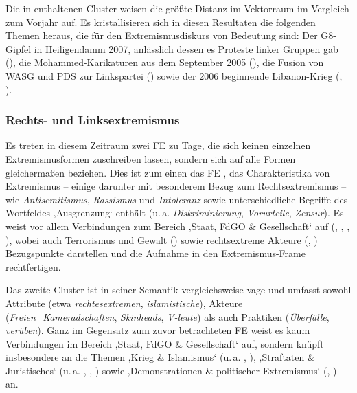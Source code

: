 Die in  enthaltenen Cluster weisen die größte Distanz im Vektorraum im Vergleich zum Vorjahr auf. Es kristallisieren sich in diesen Resultaten die folgenden Themen heraus, die für den Extremismusdiskurs von Bedeutung sind: Der G8-Gipfel in Heiligendamm 2007, anlässlich dessen es Proteste linker Gruppen gab (), die Mohammed-Karikaturen aus dem September 2005 (), die Fusion von WASG und PDS zur Linkspartei () sowie der 2006 beginnende Libanon-Krieg (, ).

\subsubsection{Rechts- und Linksextremismus}\label{rechts--und-linksextremismus-2}

Es treten in diesem Zeitraum zwei FE zu Tage, die sich keinen einzelnen Extremismusformen zuschreiben lassen, sondern sich auf alle Formen gleichermaßen beziehen. Dies ist zum einen das FE , das Charakteristika von Extremismus -- einige darunter mit besonderem Bezug zum Rechtsextremismus -- wie \emph{Antisemitismus}, \emph{Rassismus} und \emph{Intoleranz} sowie unterschiedliche Begriffe des Wortfeldes ‚Ausgrenzung` enthält (u.\,a. \emph{Diskriminierung}, \emph{Vorurteile}, \emph{Zensur}). Es weist vor allem Verbindungen zum Bereich ‚Staat, FdGO \& Gesellschaft` auf (, , , ), wobei auch Terrorismus und Gewalt () sowie rechtsextreme Akteure (, ) Bezugspunkte darstellen und die Aufnahme in den Extremismus-Frame rechtfertigen.

Das zweite Cluster  ist in seiner Semantik vergleichsweise vage und umfasst sowohl Attribute (etwa \emph{rechtesextremen}, \emph{islamistische}), Akteure (\emph{Freien\_Kameradschaften}, \emph{Skinheads}, \emph{V-leute}) als auch Praktiken (\emph{Überfälle}, \emph{verüben}). Ganz im Gegensatz zum zuvor betrachteten FE weist es kaum Verbindungen im Bereich ‚Staat, FdGO \& Gesellschaft` auf, sondern knüpft insbesondere an die Themen ‚Krieg \& Islamismus` (u.\,a. , ), ‚Straftaten \& Juristisches` (u.\,a. , , ) sowie ‚Demonstrationen \& politischer Extremismus` (, ) an.

